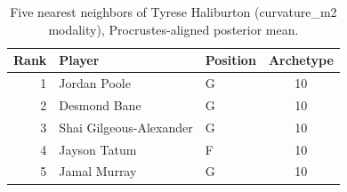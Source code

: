 \begin{table}[htbp]
  \centering\small
  \begin{tabular}{rllc}
    \toprule
    Rank & Player & Position & Archetype \\
    \midrule
    1 & Jordan Poole & G & 10 \\
    2 & Desmond Bane & G & 10 \\
    3 & Shai Gilgeous-Alexander & G & 10 \\
    4 & Jayson Tatum & F & 10 \\
    5 & Jamal Murray & G & 10 \\
    \bottomrule
  \end{tabular}
  \caption{Five nearest neighbors of Tyrese Haliburton (curvature_m2 modality), Procrustes-aligned posterior mean.}
  \label{tab:Tyrese_Haliburton_neighbors_curvature_m2}
\end{table}

